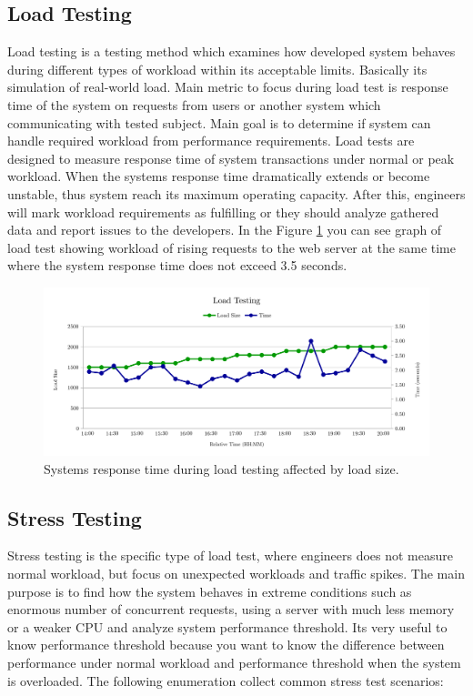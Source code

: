 \subsection*{Load Testing}
Load testing is a testing method which examines how developed system behaves during different types of workload within its acceptable limits. Basically its simulation of real-world load. Main metric to focus during load test is response time of the system on requests from users or another system which communicating with tested subject. Main goal is to determine if system can handle required workload from performance requirements. Load tests are designed to measure response time of system transactions under normal or peak workload. When the systems response time dramatically extends or become unstable, thus system reach its maximum operating capacity. After this, engineers will mark workload requirements as fulfilling or they should analyze gathered data and report issues to the developers. In the Figure \ref{fig:load_test} you can see graph of load test showing workload of rising requests to the web server at the same time where the system response time does not exceed 3.5 seconds.

\begin{figure}[H]
  \centering
  \includegraphics[width=15cm]{obrazky-figures/load-testing.pdf}
  \caption{Systems response time during load testing affected by load size.}
  \label{fig:load_test}
\end{figure}

\subsection*{Stress Testing}
\label{Stress Testing}
Stress testing is the specific type of load test, where engineers does not measure normal workload, but focus on unexpected workloads and traffic spikes. The main purpose is to find how the system behaves in extreme conditions such as enormous number of concurrent requests, using a server with much less memory or a weaker CPU and analyze system performance threshold. Its very useful to know performance threshold because you want to know the difference between performance under normal workload and performance threshold when the system is overloaded. The following enumeration collect common stress test scenarios: 

